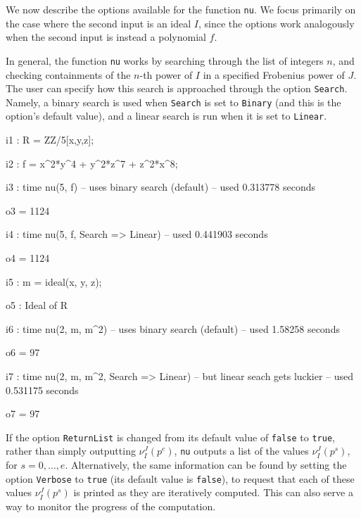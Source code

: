 \documentclass{amsart}
\begin{document}
We now describe the options available for the function {\tt nu}.  We focus primarily on the case where the second input is an ideal $I$, since the options work analogously when the second input is instead a polynomial $f$.

In general, the function {\tt nu} works by searching through the list of integers $n$, and checking containments of the $n$-th power of $I$ in a specified Frobenius power of $J$.
The user can specify how this search is approached through the  option {\tt Search}.  Namely, a binary search is used when {\tt Search} is set to {\tt Binary} (and this is the option's default value), and a linear search is run when it is set to {\tt Linear}.

\medspace
{\small
{}
\begin{MyVerbatim}

i1 : R = ZZ/5[x,y,z];

i2 : f = x^2*y^4 + y^2*z^7 + z^2*x^8;

i3 : time nu(5, f) -- uses binary search (default)
     -- used 0.313778 seconds

o3 = 1124

i4 : time nu(5, f, Search => Linear)
     -- used 0.441903 seconds

o4 = 1124

i5 : m = ideal(x, y, z);

o5 : Ideal of R

i6 : time nu(2, m, m^2) -- uses binary search (default)
     -- used 1.58258 seconds

o6 = 97

i7 : time nu(2, m, m^2, Search => Linear) -- but linear seach gets luckier
     -- used 0.531175 seconds

o7 = 97
\end{MyVerbatim}
}
\medspace



If the option {\tt ReturnList} is changed from its default value of {\tt false} to {\tt true}, rather than simply outputting $\nu_I^J(p^e)$, {\tt nu} outputs a list of the values $\nu_I^J(p^s)$, for $s=0,\ldots,e$.
Alternatively, the same information can be found by setting the option {\tt Verbose} to {\tt true} (its default value is {\tt false}), to request that each of these values $\nu_I^J(p^s)$ is printed as they are iteratively computed.  This can also serve a way to monitor the progress of the computation.
\end{document}

